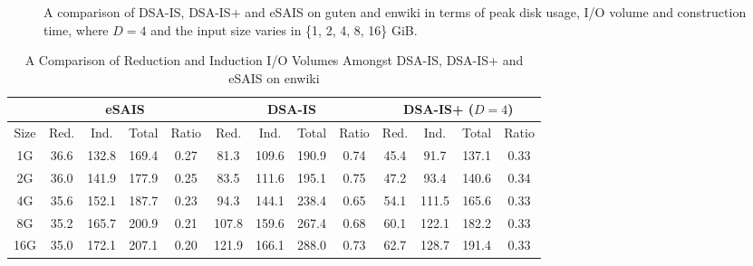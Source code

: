 \documentclass[10pt,journal,compsoc]{IEEEtran}
\begin{document}
\begin{figure}[t]
{\begin{minipage}[b]{0.45\textwidth}
		\end{minipage}
	}
	\caption{A comparison of DSA-IS, DSA-IS+ and eSAIS on guten and enwiki in terms of peak disk usage, I/O volume and construction time, where $D = 4$ and the input size varies in \{1, 2, 4, 8, 16\} GiB. }
	\label{fig:construction_performance1}
\end{figure}

\begin{table}%
	\caption{A Comparison of Reduction and Induction I/O Volumes Amongst DSA-IS, DSA-IS+ and eSAIS on enwiki}
	\label{tbl:volume_cmp}
	\centering
	\begin{tabular}{|c|c|c|c|c|c|c|c|c|c|c|c|c|}
		\hline
		\multicolumn{1}{|c}{} & \multicolumn{4}{|c|}{eSAIS} & \multicolumn{4}{c|}{DSA-IS} & \multicolumn{4}{c|}{DSA-IS+ ($D = 4$)}\\\hline
		\hline
		Size & Red. & Ind. & Total & Ratio & Red. & Ind. & Total & Ratio & Red. & Ind. & Total & Ratio\\\hline
		1G & 36.6 & 132.8 & 169.4 & 0.27 & 81.3 & 109.6 & 190.9 & 0.74 & 45.4 & 91.7 & 137.1 & 0.33\\\hline
		2G & 36.0 & 141.9 & 177.9 & 0.25 & 83.5 & 111.6 & 195.1 & 0.75 & 47.2 & 93.4 & 140.6 & 0.34\\\hline
		4G & 35.6 & 152.1 & 187.7 & 0.23 & 94.3 & 144.1 & 238.4 & 0.65 & 54.1 & 111.5  & 165.6 & 0.33\\\hline
		8G & 35.2 & 165.7 & 200.9 & 0.21 & 107.8 & 159.6 & 267.4 & 0.68 & 60.1 & 122.1 & 182.2 & 0.33\\\hline
		16G & 35.0 & 172.1 & 207.1 & 0.20 & 121.9 & 166.1 & 288.0 & 0.73 & 62.7 & 128.7 & 191.4 & 0.33\\\hline
	\end{tabular}
\end{table}%
\end{document}
